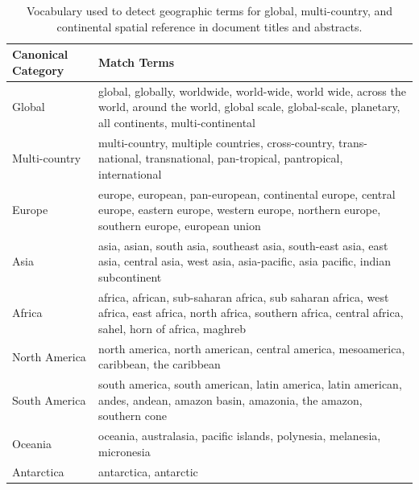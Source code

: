 \documentclass[preprint,12pt,authoryear]{elsarticle}
\begin{document}
\begin{table}[!ht]
    \centering
    \begin{tabularx}{\linewidth}{|l|X|}
    \hline
        \textbf{Canonical Category} & \textbf{Match Terms} \\ \hline
        Global & global, globally, worldwide, world-wide, world wide, across the world, \newline around the world, global scale, global-scale, planetary, all continents, multi-continental \\ \hline
        Multi-country & multi-country, multiple countries, cross-country, trans-national, \newline transnational, pan-tropical, pantropical, international \\ \hline
        Europe & europe, european, pan-european, continental europe, central europe, \newline eastern europe, western europe, northern europe, southern europe, european union \\ \hline
        Asia & asia, asian, south asia, southeast asia, south-east asia, east asia, \newline central asia, west asia, asia-pacific, asia pacific, indian subcontinent \\ \hline
        Africa & africa, african, sub-saharan africa, sub saharan africa, west africa, \newline east africa, north africa, southern africa, central africa, sahel, horn of africa, maghreb \\ \hline
        North America & north america, north american, central america, mesoamerica, caribbean, \newline the caribbean \\ \hline
        South America & south america, south american, latin america, latin american, andes, \newline andean, amazon basin, amazonia, the amazon, southern cone \\ \hline
        Oceania & oceania, australasia, pacific islands, polynesia, melanesia, micronesia \\ \hline
        Antarctica & antarctica, antarctic \\ \hline
    \end{tabularx}
    \caption{Vocabulary used to detect geographic terms for global, multi-country, and continental spatial reference in document titles and abstracts.}
    \label{tab:detec_geo}
\end{table}
\end{document}

